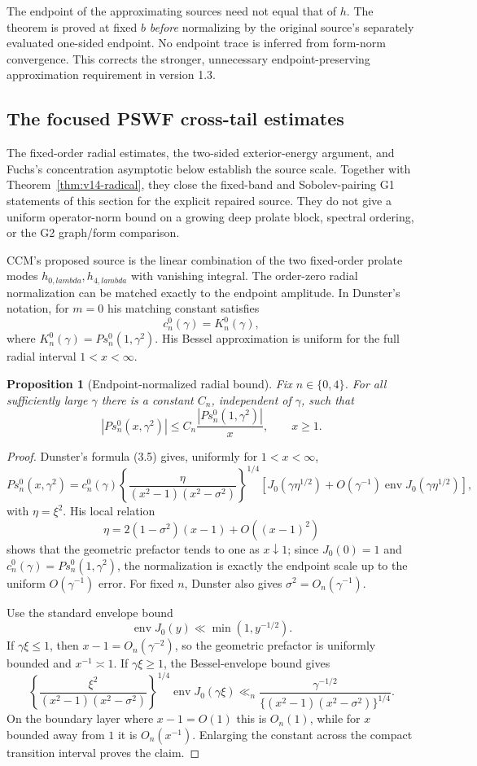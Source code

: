 \documentclass[11pt]{article}
\def\lambda{lambda}%
\newtheorem{proposition}[theorem]{Proposition}
\theoremstyle{remark}
\begin{document}
The endpoint of the approximating sources need not equal that of $h$.
The theorem is proved at fixed $b$ \emph{before} normalizing by the
original source's separately evaluated one-sided endpoint. No endpoint
trace is inferred from form-norm convergence. This corrects the stronger,
unnecessary endpoint-preserving approximation requirement in version 1.3.

\subsection{The focused PSWF cross-tail estimates}
The fixed-order radial estimates, the two-sided exterior-energy argument,
and Fuchs's concentration asymptotic below establish the source scale.
Together with Theorem~\ref{thm:v14-radical}, they close the fixed-band
and Sobolev-pairing G1 statements of this section for the explicit repaired
source. They do not give a uniform operator-norm bound on a growing deep
prolate block, spectral ordering, or the G2 graph/form comparison.


CCM's proposed source is the linear combination of the two fixed-order prolate modes $h_{0,\lambda},h_{4,\lambda}$ with vanishing integral.  The order-zero radial normalization can be matched exactly to the endpoint amplitude.  In Dunster's notation, for $m=0$ his matching constant satisfies
\[
 c_n^0(\gamma)=K_n^0(\gamma),
\]
where $K_n^0(\gamma)=Ps_n^0(1,\gamma^2)$.  His Bessel approximation is uniform for the full radial interval $1<x<\infty$.

\begin{proposition}[Endpoint-normalized radial bound]\label{prop:endpoint-radial}
Fix $n\in\{0,4\}$.  For all sufficiently large $\gamma$ there is a constant $C_n$, independent of $\gamma$, such that
\[
 |Ps_n^0(x,\gamma^2)|\le C_n\frac{|Ps_n^0(1,\gamma^2)|}{x},
 \qquad x\ge1.
\]
\end{proposition}
\begin{proof}
Dunster's formula (3.5) gives, uniformly for $1<x<\infty$,
\[
 Ps_n^0(x,\gamma^2)
 =c_n^0(\gamma)
 \left\{\frac{\eta}{(x^2-1)(x^2-\sigma^2)}\right\}^{1/4}
 \left[J_0(\gamma\eta^{1/2})
 +O(\gamma^{-1})\operatorname{env}J_0(\gamma\eta^{1/2})\right],
\]
with $\eta=\xi^2$.  His local relation
\[
 \eta=2(1-\sigma^2)(x-1)+O((x-1)^2)
\]
shows that the geometric prefactor tends to one as $x\downarrow1$; since $J_0(0)=1$ and $c_n^0(\gamma)=Ps_n^0(1,\gamma^2)$, the normalization is exactly the endpoint scale up to the uniform $O(\gamma^{-1})$ error.  For fixed $n$, Dunster also gives $\sigma^2=O_n(\gamma^{-1})$.

Use the standard envelope bound
\[
 \operatorname{env}J_0(y)\ll \min(1,y^{-1/2}).
\]
If $\gamma\xi\le1$, then $x-1=O_n(\gamma^{-2})$, so the geometric prefactor is uniformly bounded and $x^{-1}\asymp1$.  If $\gamma\xi\ge1$, the Bessel-envelope bound gives
\[
 \left\{\frac{\xi^2}{(x^2-1)(x^2-\sigma^2)}\right\}^{1/4}
 \operatorname{env}J_0(\gamma\xi)
 \ll_n
 \frac{\gamma^{-1/2}}{\{(x^2-1)(x^2-\sigma^2)\}^{1/4}}.
\]
On the boundary layer where $x-1=O(1)$ this is $O_n(1)$, while for $x$ bounded away from $1$ it is $O_n(x^{-1})$.  Enlarging the constant across the compact transition interval proves the claim.
\end{proof}
\end{document}
